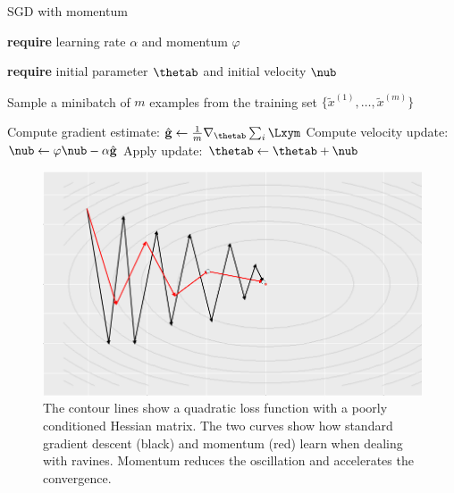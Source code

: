 \begin{vbframe}{SGD with momentum}
  \begin{algorithm}[H]
  \small
    \caption{Stochastic gradient descent with momentum}
    \begin{algorithmic}[1]
    \State \textbf{require} learning rate $\alpha$ and momentum $\varphi$ \strut
    \State \textbf{require} initial parameter $\thetab$ and initial velocity $\nub$ \strut
        \State \parbox[t]{\dimexpr\linewidth-\algorithmicindent}{Sample a minibatch of $m$ examples from the training set $\{\tilde{x}^{(1)},\dots,\tilde{x}^{(m)}\}$}
        \State Compute gradient estimate: $\hat{\mathbf{g}} \leftarrow  \frac{1}{m} \nabla_{\thetab} \sum_{i} \Lxym$
        \State Compute velocity update: $\nub \leftarrow \varphi \nub - \alpha \hat{\mathbf{g}}$
        \State Apply update: $\thetab \leftarrow \thetab + \nub$
      \EndWhile
    \end{algorithmic}
  \end{algorithm}
  
\framebreak
  
  \begin{figure}
  \captionsetup{font=footnotesize,labelfont=footnotesize, labelfont = bf}
  \centering
    \includegraphics[height = 6 cm, width = 10 cm]{figure/momentum.png}
    \caption{The contour lines show a quadratic loss function with a poorly conditioned Hessian matrix. The two curves show how standard gradient descent (black) and momentum (red) learn when dealing with ravines. Momentum reduces the oscillation and accelerates the convergence.}
  \end{figure}
\end{vbframe}

